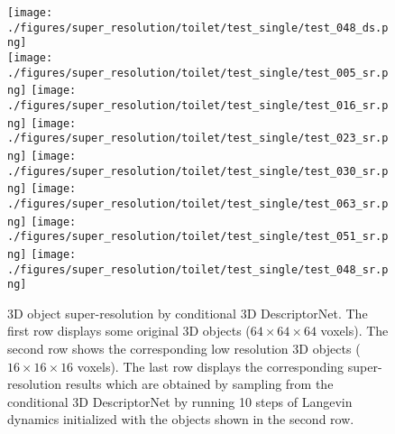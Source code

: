 \documentclass[10pt,twocolumn,letterpaper]{article}
\begin{document}
\begin{figure}
    \texttt{[image: ./figures/super\_resolution/toilet/test\_single/test\_048\_ds.png]}
   	\\
	\texttt{[image: ./figures/super\_resolution/toilet/test\_single/test\_005\_sr.png]}\hspace{-1.8mm}
	\texttt{[image: ./figures/super\_resolution/toilet/test\_single/test\_016\_sr.png]}\hspace{-1.1mm}
	\texttt{[image: ./figures/super\_resolution/toilet/test\_single/test\_023\_sr.png]}\hspace{-1.8mm}
	\texttt{[image: ./figures/super\_resolution/toilet/test\_single/test\_030\_sr.png]}\hspace{-1.8mm}
	\texttt{[image: ./figures/super\_resolution/toilet/test\_single/test\_063\_sr.png]}\hspace{-1.8mm}
	\texttt{[image: ./figures/super\_resolution/toilet/test\_single/test\_051\_sr.png]}\hspace{-2.2mm}
	\texttt{[image: ./figures/super\_resolution/toilet/test\_single/test\_048\_sr.png]}\\
	
		\caption{3D object super-resolution by conditional 3D DescriptorNet. The first row displays some original 3D objects ($64 \times 64 \times 64$ voxels). The second row shows the corresponding low resolution 3D objects ($16 \times 16 \times 16$ voxels). The last row displays the corresponding super-resolution results which are obtained by sampling from the conditional 3D DescriptorNet by running 10 steps of Langevin dynamics initialized with the objects shown in the second row.}	
	\label{exp:superResolution}
\end{figure}
\end{document}
